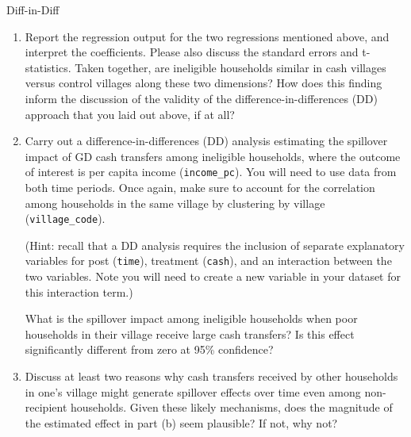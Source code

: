 \begin{homeworkProblem}{Diff-in-Diff}
\begin{enumerate}
        \begin{enumerate}
            \item Report the regression output for the two regressions 
                mentioned above, and interpret the coefficients. Please 
                also discuss the standard errors and t-statistics. Taken 
                together, are ineligible households similar in cash 
                villages versus control villages along these two 
                dimensions? How does this finding inform the discussion of 
                the validity of the difference-in-differences (DD) 
                approach that you laid out above, if at all?
            \item Carry out a difference-in-differences (DD) analysis 
                estimating the spillover impact of GD cash transfers 
                among ineligible households, where the outcome of interest 
                is per capita income (\texttt{income\_pc}). You will need 
                to use data from both time periods. Once again, make sure 
                to account for the correlation among households in the 
                same village by clustering by village 
                (\texttt{village\_code}). 
                
                (Hint: recall that a DD analysis requires the inclusion 
                of separate explanatory variables for post 
                (\texttt{time}), treatment (\texttt{cash}), and an 
                interaction between the two variables. Note you will need 
                to create a new variable in your dataset for this 
                interaction term.) 
                
                What is the spillover impact among ineligible households 
                when poor households in their village receive large cash 
                transfers? Is this effect significantly different from 
                zero at 95\% confidence?
            \item Discuss at least two reasons why cash transfers 
                received by other households in one's village might 
                generate spillover effects over time even among 
                non-recipient households. Given these likely mechanisms, 
                does the magnitude of the estimated effect in part (b) 
                seem plausible? If not, why not?
        \end{enumerate}
    \end{enumerate}

\end{homeworkProblem}